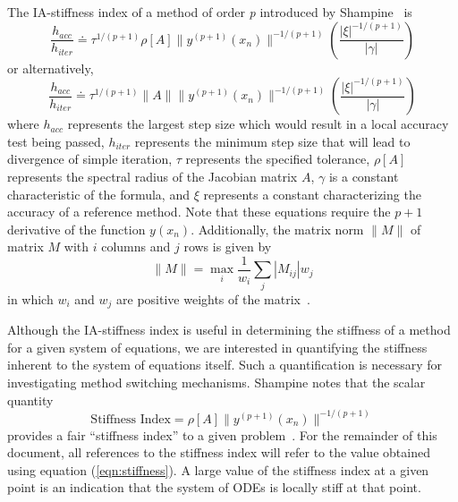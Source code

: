 \documentclass[12pt]{ussci}
\begin{document}
The IA-stiffness index of a method of order \textit{p} introduced by Shampine~\cite{Shampine1982} is
\begin{equation}
    \frac{h_{acc}}{h_{iter}} \doteq \tau ^ {1/(p + 1)} \rho [A] \|y^{(p+1)}(x_n)\|^{-1/(p+1)} \left( \frac{|\xi|^{-1/(p+1)}}{|\gamma|} \right)
\end{equation}
or alternatively,
\begin{equation}
    \frac{h_{acc}}{h_{iter}} \doteq \tau ^ {1/(p + 1)} \|A\|\|y^{(p+1)}(x_n)\|^{-1/(p+1)} \left( \frac{|\xi|^{-1/(p+1)}}{|\gamma|} \right)
\end{equation}
where $h_{acc}$ represents the largest step size which would result in a local accuracy test being passed, $h_{iter}$ represents the minimum step size that will lead to divergence of simple iteration, $\tau$ represents the specified tolerance, $\rho [A]$ represents the spectral radius of the Jacobian matrix $A$, $\gamma$ is a constant characteristic of the formula, and $\xi$ represents a constant characterizing the accuracy of a reference method.
Note that these equations require the $p+1$ derivative of the function $y(x_n)$.
Additionally, the matrix norm $\|M\|$ of matrix $M$ with $i$ columns and $j$ rows is given by
\begin{equation}
    \|M\| = \max_{i} \frac{1}{w_i} \sum_{j} |M_{ij}|w_j
\end{equation}
in which \(w_i\) and \(w_j\) are positive weights of the matrix~\cite{Shampine1985}.

Although the IA-stiffness index is useful in determining the stiffness of a method for a given system of equations, we are interested in quantifying the stiffness inherent to the system of equations itself.
Such a quantification is necessary for investigating method switching mechanisms.
Shampine notes that the scalar quantity
\begin{equation}\label{eqn:stiffness}
    \textrm{Stiffness Index} = \rho [A] \|y^{(p+1)}(x_n)\|^{-1/(p+1)}
\end{equation}
provides a fair ``stiffness index'' to a given problem~\cite{Shampine1985}. For the remainder of this document, all references to the stiffness index will refer to the value obtained using equation (\ref{eqn:stiffness}).
A large value of the stiffness index at a given point is an indication that the system of ODEs is locally stiff at that point.
\end{document}

